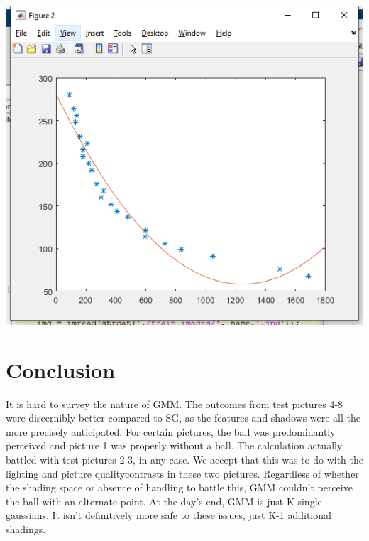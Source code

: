 \documentclass{article}
\begin{document}
    \includegraphics[scale = 0.6]{distance fit.png}
    
\section{Conclusion}
It is hard to survey the nature of GMM. The outcomes from test pictures 4-8 were discernibly better compared to SG, as the features and shadows were all the more precisely anticipated. For certain pictures, the ball was predominantly perceived and picture 1 was properly without a ball. The calculation actually battled with test pictures 2-3, in any case. We accept that this was to do with the lighting and picture qualitycontrasts in these two pictures. Regardless of whether the shading space or absence of handling to battle this, GMM couldn't perceive the ball with an alternate point. At the day's end, GMM is just K single gaussians. It isn't definitively more safe to these issues, just K-1 additional shadings.
\end{document}
